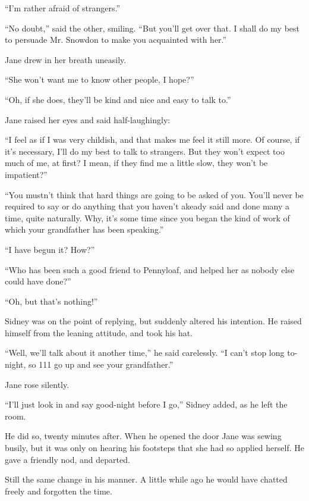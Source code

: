``I'm rather afraid of strangers.''

``No doubt,'' said the other, smiling. ``But you'll get over that. I
shall do my best to persuade Mr. Snowdon to make you acquainted with
her.''

Jane drew in her breath uneasily.

``She won't want me to know other people, I hope?''

``Oh, if she does, they'll be kind and nice and easy to talk to.''

Jane raised her eyes and said half-laughingly:

``I feel as if I was very childish, and that makes me feel it still
more. Of course, if it's necessary, I'll do my best to talk to
strangers. {\protect\hypertarget{262}{}{}}But they won't expect too much
of me, at first? I mean, if they find me a little slow, they won't be
impatient?''

``You mustn't think that hard things are going to be asked of you.
You'll never be required to say or do anything that you haven't akeady
said and done many a time, quite naturally. Why, it's some time since
you began the kind of work of which your grandfather has been
speaking.''

``I have begun it? How?''

``Who has been such a good friend to Pennyloaf, and helped her as nobody
else could have done?''

``Oh, but that's nothing!''

Sidney was on the point of replying, but suddenly altered his intention.
He raised himself from the leaning attitude, and took his hat.

``Well, we'll talk about it another time,'' he said carelessly. ``I
can't stop long to-night, so 111 go up and see your grandfather.''

Jane rose silently.

``I'll just look in and say good-night before I go,'' Sidney added, as
he left the room.

{\protect\hypertarget{263}{}{}}He did so, twenty minutes after. When he
opened the door Jane was sewing busily, but it was only on hearing his
footsteps that she had so applied herself. He gave a friendly nod, and
departed.

Still the same change in his manner. A little while ago he would have
chatted freely and forgotten the time.

